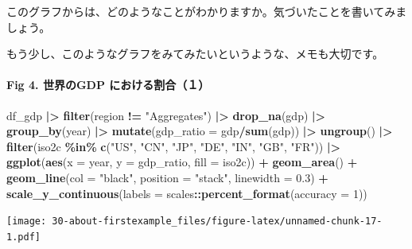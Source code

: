 \documentclass[
  xelatex, ja=standard]{bxjsbook}
\newenvironment{Shaded}{\begin{snugshade}}{\end{snugshade}}
\newcommand{\AttributeTok}[1]{\textcolor[rgb]{0.13,0.29,0.53}{#1}}
\newcommand{\DecValTok}[1]{\textcolor[rgb]{0.00,0.00,0.81}{#1}}
\newcommand{\FloatTok}[1]{\textcolor[rgb]{0.00,0.00,0.81}{#1}}
\newcommand{\FunctionTok}[1]{\textcolor[rgb]{0.13,0.29,0.53}{\textbf{#1}}}
\newcommand{\NormalTok}[1]{#1}
\newcommand{\SpecialCharTok}[1]{\textcolor[rgb]{0.81,0.36,0.00}{\textbf{#1}}}
\newcommand{\StringTok}[1]{\textcolor[rgb]{0.31,0.60,0.02}{#1}}
\theoremstyle{definition}
\theoremstyle{definition}
\theoremstyle{definition}
\theoremstyle{definition}
\theoremstyle{remark}
\begin{document}
このグラフからは、どのようなことがわかりますか。気づいたことを書いてみましょう。

もう少し、このようなグラフをみてみたいというような、メモも大切です。

\hypertarget{fig-4.-ux4e16ux754cux306egdp-ux306bux304aux3051ux308bux5272ux5408uxff11-1}{%
\paragraph{Fig 4. 世界のGDP における割合（１）}\label{fig-4.-ux4e16ux754cux306egdp-ux306bux304aux3051ux308bux5272ux5408uxff11-1}}

\begin{Shaded}
\begin{Highlighting}[]
\NormalTok{df\_gdp }\SpecialCharTok{|\textgreater{}} 
  \FunctionTok{filter}\NormalTok{(region }\SpecialCharTok{!=} \StringTok{"Aggregates"}\NormalTok{) }\SpecialCharTok{|\textgreater{}} \FunctionTok{drop\_na}\NormalTok{(gdp) }\SpecialCharTok{|\textgreater{}} 
  \FunctionTok{group\_by}\NormalTok{(year) }\SpecialCharTok{|\textgreater{}} \FunctionTok{mutate}\NormalTok{(}\AttributeTok{gdp\_ratio =}\NormalTok{ gdp}\SpecialCharTok{/}\FunctionTok{sum}\NormalTok{(gdp)) }\SpecialCharTok{|\textgreater{}} \FunctionTok{ungroup}\NormalTok{() }\SpecialCharTok{|\textgreater{}}
  \FunctionTok{filter}\NormalTok{(iso2c }\SpecialCharTok{\%in\%} \FunctionTok{c}\NormalTok{(}\StringTok{"US"}\NormalTok{, }\StringTok{"CN"}\NormalTok{, }\StringTok{"JP"}\NormalTok{, }\StringTok{"DE"}\NormalTok{, }\StringTok{"IN"}\NormalTok{, }\StringTok{"GB"}\NormalTok{, }\StringTok{"FR"}\NormalTok{))  }\SpecialCharTok{|\textgreater{}}
  \FunctionTok{ggplot}\NormalTok{(}\FunctionTok{aes}\NormalTok{(}\AttributeTok{x =}\NormalTok{ year, }\AttributeTok{y =}\NormalTok{ gdp\_ratio, }\AttributeTok{fill =}\NormalTok{ iso2c)) }\SpecialCharTok{+} \FunctionTok{geom\_area}\NormalTok{() }\SpecialCharTok{+}
  \FunctionTok{geom\_line}\NormalTok{(}\AttributeTok{col =} \StringTok{"black"}\NormalTok{, }\AttributeTok{position =} \StringTok{"stack"}\NormalTok{, }\AttributeTok{linewidth =} \FloatTok{0.3}\NormalTok{) }\SpecialCharTok{+} 
  \FunctionTok{scale\_y\_continuous}\NormalTok{(}\AttributeTok{labels =}\NormalTok{ scales}\SpecialCharTok{::}\FunctionTok{percent\_format}\NormalTok{(}\AttributeTok{accuracy =} \DecValTok{1}\NormalTok{))}
\end{Highlighting}
\end{Shaded}

\texttt{[image: 30-about-firstexample\_files/figure-latex/unnamed-chunk-17-1.pdf]}
\end{document}
